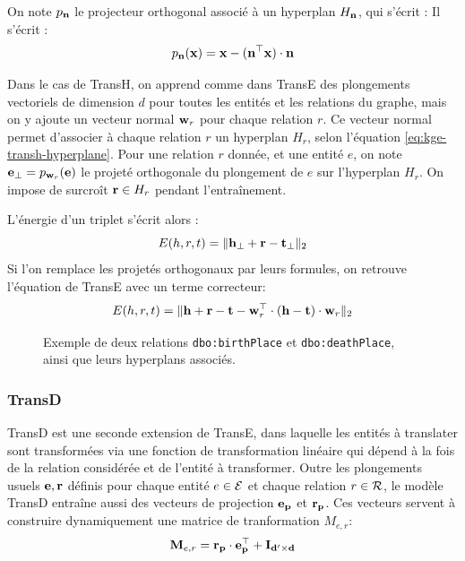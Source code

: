 On note $p_{\bf{n}}$ le projecteur orthogonal associé à un hyperplan $H_{\bf{n}}$, qui s'écrit : %
Il s'écrit :
\begin{equation}
    p_{\bf{n}}(\bf{x}) = \bf{x - (n^\top x) \cdot n}
\end{equation}

Dans le cas de TransH, on apprend comme dans TransE des plongements vectoriels de dimension $d$ pour toutes les entités et les relations du graphe, mais on y ajoute un vecteur normal $\bf{w}_r$ pour chaque relation $r$. Ce vecteur normal permet d'associer à chaque relation $r$ un hyperplan $H_r$, selon l'équation \ref{eq:kge-transh-hyperplane}.
%
Pour une relation $r$ donnée, et une entité $e$, on note $\bf{e_\bot} = p_{\bf{w}_r}(\bf{e})$ le projeté orthogonale du plongement de $e$ sur l'hyperplan $H_r$. On impose de surcroît $\bf{r} \in H_r$ pendant l'entraînement.

L'énergie d'un triplet s'écrit alors :
\begin{equation}
    E(h, r, t) = \| \bf{h_\bot + r - t_\bot} \|_2
    \label{eq:kge-transh-main}
\end{equation}
Si l'on remplace les projetés orthogonaux par leurs formules, on retrouve l'équation de TransE avec un terme correcteur:
\begin{equation}
    E(h, r, t) = \| \bf{h + r - t} - \bf{w}_r^\top \cdot (\bf{h - t}) \cdot \bf{w}_r \|_2
    \label{eq:kge-transh-long}
\end{equation}

\begin{figure}[hbt]
    \centering
    
    \caption[Exemple des possibilités laissées par TransH]{Exemple de deux relations \texttt{dbo:birthPlace} et \texttt{dbo:deathPlace}, ainsi que leurs hyperplans associés.}
    \label{fig:transh-dual}
\end{figure}

\subsubsection{TransD}

TransD est une seconde extension de TransE, dans laquelle les entités à translater sont transformées via une fonction de transformation linéaire qui dépend à la fois de la relation considérée et de l'entité à transformer. Outre les plongements usuels $\bf{e}, \bf{r}$ définis pour chaque entité $e \in \Ent $ et chaque relation $r \in \Rel$, le modèle TransD entraîne aussi des vecteurs de projection $\bf{e_p}$ et $\bf{r_p}$. Ces vecteurs servent à construire dynamiquement une matrice de tranformation $M_{e, r}$:
\begin{equation}
    \label{eq:kge-transd-matrix}
    \bf{M}_{e, r} = \bf{r_p \cdot e_p^\top + I_{d' \times d}}
\end{equation}

